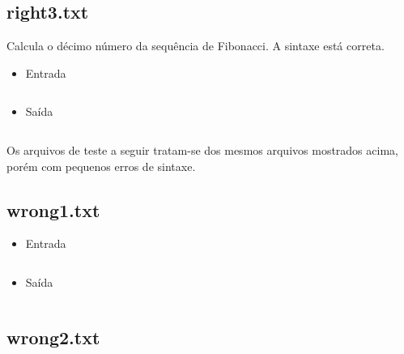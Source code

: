 \documentclass[a4paper,12pt]{report}
\begin{document}
\subsection{right3.txt}

Calcula o décimo número da sequência de Fibonacci. A sintaxe está correta.

\begin{itemize}
 \item Entrada
 
 \begin{mdframed}[linecolor=black, leftline=false, rightline=false]
    \inputminted[linenos, fontsize=\footnotesize]{text}{../input/right3.txt}
\end{mdframed}
 
 \item Saída

 \begin{mdframed}[linecolor=black, leftline=false, rightline=false]
    \inputminted[linenos, fontsize=\footnotesize]{text}{../output/right3.txt}
  \end{mdframed}
  
\end{itemize}

Os arquivos de teste a seguir tratam-se dos mesmos arquivos mostrados acima, porém com pequenos erros de sintaxe.

\subsection{wrong1.txt}

\begin{itemize}
 \item Entrada
 
 \begin{mdframed}[linecolor=black, leftline=false, rightline=false]
    \inputminted[linenos, fontsize=\footnotesize]{text}{../input/wrong1.txt}
\end{mdframed}
 
 \item Saída

 \begin{mdframed}[linecolor=black, leftline=false, rightline=false]
    \inputminted[linenos, fontsize=\footnotesize]{text}{../output/wrong1.txt}
  \end{mdframed}
  
\end{itemize}

\subsection{wrong2.txt}
\end{document}
